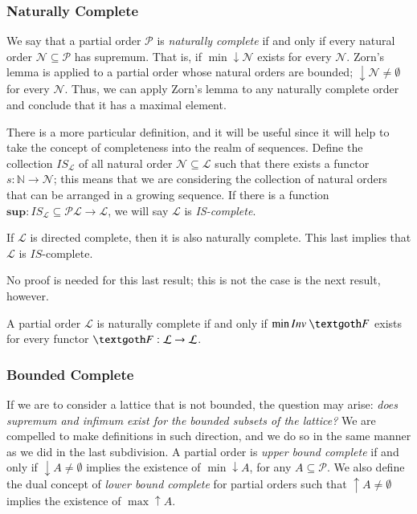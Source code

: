 \documentclass [12pt]{book}
\begin{document}
			\subsubsection{Naturally Complete}

We say that a partial order $\mathcal P$ is \textit{naturally complete} if and only if every natural order $\mathcal N\subseteq\mathcal P$ has supremum. That is, if $\min\downarrow\mathcal N$ exists for every $\mathcal N$. Zorn's lemma is applied to a partial order whose natural orders are bounded; $\downarrow\mathcal N\neq\emptyset$ for every $\mathcal N$. Thus, we can apply Zorn's lemma to any naturally complete order and conclude that it has a maximal element.

There is a more particular definition, and it will be useful since it will help to take the concept of completeness into the realm of sequences. Define the collection $IS_\mathcal L$ of all natural order $\mathcal N\subseteq\mathcal L$ such that there exists a functor $s:\mathbb N\rightarrow\mathcal N$; this means that we are considering the collection of natural orders that can be arranged in a growing sequence. If there is a function $\textbf{sup}:IS_\mathcal L\subseteq\mathcal{PL}\rightarrow\mathcal L$, we will say $\mathcal L$ is \textit{IS-complete}.

\begin{proposition}If $\mathcal L$ is directed complete, then it is also naturally complete. This last implies that $\mathcal L$ is $IS$-complete.\end{proposition}

No proof is needed for this last result; this is not the case is the next result, however.

\begin{proposition}A partial order $\mathcal L$ is naturally complete if and only if $\min Inv~\textgoth F$ exists for every functor $\textgoth F:\mathcal L\rightarrow\mathcal L$.\end{proposition}

			\subsubsection{Bounded Complete}

If we are to consider a lattice that is not bounded, the question may arise: \textit{does supremum and infimum exist for the bounded subsets of the lattice?} We are compelled to make definitions in such direction, and we do so in the same manner as we did in the last subdivision. A partial order is \textit{upper bound complete} if and only if $\downarrow A\neq\emptyset$ implies the existence of $\min\downarrow A$, for any $A\subseteq\mathcal P$. We also define the dual concept of \textit{lower bound complete} for partial orders such that $\uparrow A\neq\emptyset$ implies the existence of $\max\uparrow A$.
\end{document}
